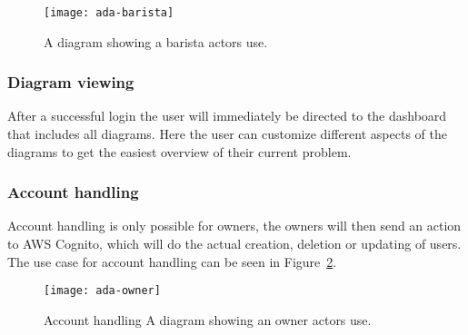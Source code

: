 \begin{figure}[H]
    \centering
    \texttt{[image: ada-barista]}
    \caption{A diagram showing a barista actors use.}\label{fig:barista-conditional}
\end{figure}

\subsubsection{Diagram viewing}\label{subsubsec:diagram_viewing_usecase}

After a successful login the user will immediately be directed to the dashboard that includes all diagrams.
Here the user can customize different aspects of the diagrams to get the easiest overview of their current problem.

\subsubsection{Account handling}\label{subsubsec:account_handling_usecase}
Account handling is only possible for owners, the owners will then send an action to AWS Cognito, which will
do the actual creation, deletion or updating of users.
The use case for account handling can be seen in Figure~\ref{fig:owner-conditional}.

\begin{figure}[H]
    \centering
    \texttt{[image: ada-owner]}
    \caption{Account handling A diagram showing an owner actors use.}\label{fig:owner-conditional}
\end{figure}
